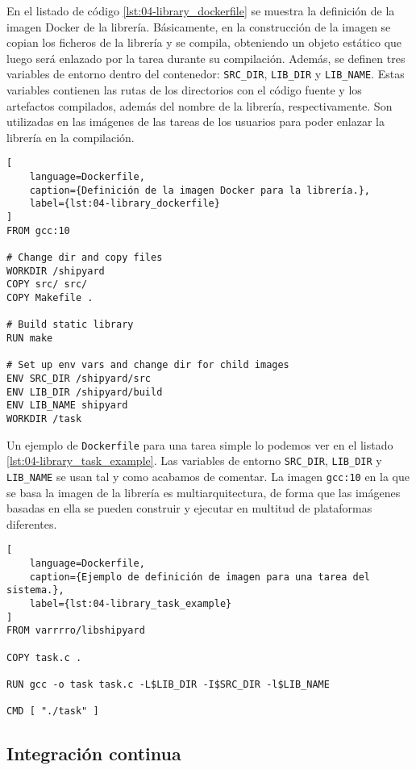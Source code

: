 En el listado de código \ref{lst:04-library_dockerfile} se muestra la definición
de la imagen Docker de la librería. Básicamente, en la construcción de la imagen
se copian los ficheros de la librería y se compila, obteniendo un objeto
estático que luego será enlazado por la tarea durante su compilación. Además, se
definen tres variables de entorno dentro del contenedor: \texttt{SRC\_DIR},
\texttt{LIB\_DIR} y \texttt{LIB\_NAME}. Estas variables contienen las rutas de
los directorios con el código fuente y los artefactos compilados, además del
nombre de la librería, respectivamente. Son utilizadas en las imágenes de las
tareas de los usuarios para poder enlazar la librería en la compilación.

\begin{lstlisting}[
    language=Dockerfile,
    caption={Definición de la imagen Docker para la librería.},
    label={lst:04-library_dockerfile}
]
FROM gcc:10

# Change dir and copy files
WORKDIR /shipyard
COPY src/ src/
COPY Makefile .

# Build static library
RUN make

# Set up env vars and change dir for child images
ENV SRC_DIR /shipyard/src
ENV LIB_DIR /shipyard/build
ENV LIB_NAME shipyard
WORKDIR /task
\end{lstlisting}

Un ejemplo de \texttt{Dockerfile} para una tarea simple lo podemos ver en el
listado \ref{lst:04-library_task_example}. Las variables de entorno
\texttt{SRC\_DIR}, \texttt{LIB\_DIR} y \texttt{LIB\_NAME} se usan tal y como
acabamos de comentar. La imagen \texttt{gcc:10} en la que se basa la imagen de
la librería es multiarquitectura, de forma que las imágenes basadas en ella se
pueden construir y ejecutar en multitud de plataformas diferentes.

\begin{lstlisting}[
    language=Dockerfile,
    caption={Ejemplo de definición de imagen para una tarea del sistema.},
    label={lst:04-library_task_example}
]
FROM varrrro/libshipyard

COPY task.c .

RUN gcc -o task task.c -L$LIB_DIR -I$SRC_DIR -l$LIB_NAME

CMD [ "./task" ]
\end{lstlisting}

\subsection{Integración continua}

